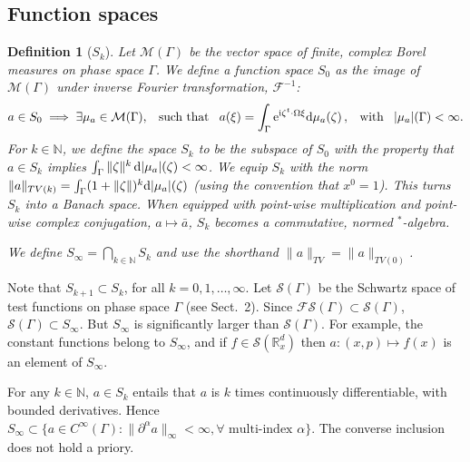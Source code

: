 \documentclass[12pt]{article}
\newcommand{\nn}{\mathbb{N}}
\newcommand{\rr}{\mathbb{R}}
\renewcommand{\d}{{\rm d}}
\newcommand{\e}{{\rm e}}
\renewcommand{\i}{{\rm i}}
\newtheorem{definition}[theorem]{Definition}
\begin{document}
\subsection{Function spaces}
\begin{definition}[$S_k$]
Let $\mathcal M(\Gamma)$ be the vector space of finite, complex Borel measures on phase space $\Gamma$. We define
a function space $S_0$ as the image of $\mathcal M(\Gamma)$ under inverse Fourier transformation, 
$\mathcal F^{-1}$:
\begin{equation}\label{Borel meas}
a\in S_0\implies \exists \mu_a\in \mathcal M(\Gamma), \,\ \mbox{ such that }\,\ a(\xi)=\int_\Gamma \e^{\i \zeta^{t}\cdot 
\Omega \xi}\d\mu_a(\zeta)\,,\,\ \mbox{ with }\,\ |\mu_a|(\Gamma)<\infty.
\end{equation}
For $k\in \nn$, we define the space $S_k$ to be the subspace of $S_0$ with the property that $a\in S_k$ implies 
$\int_\Gamma \|\zeta\|^k\, \d|\mu_a|(\zeta) <\infty$.
We equip $S_k$ with the norm $\|a\|_{TV(k)}=\int_\Gamma(1+\|\zeta\|)^k \d|\mu_a|(\zeta)$ (using the 
convention that $x^0=1$). This turns $S_k$ into a Banach space. When equipped with point-wise multiplication 
and point-wise complex conjugation, $a\mapsto\bar a$, $S_k$ becomes a commutative, normed $^{*}$-algebra.

We define $S_\infty=\bigcap_{k\in \nn} S_k$ and use the shorthand $\|a\|_{TV}=\|a\|_{TV(0)}$.
\end{definition}
Note that $S_{k+1}\subset S_k$, for all $k=0,1,\dotsc,\infty$. Let $\mathcal{S}(\Gamma)$ be the Schwartz space of 
test functions on phase space $\Gamma$ (see Sect.~2). Since $\mathcal F\mathcal S(\Gamma)\subset\mathcal S(\Gamma)$, 
$\mathcal S(\Gamma)\subset S_\infty$. But $S_\infty$ is significantly larger than $\mathcal S(\Gamma)$. 
For example, the constant functions belong to $S_\infty$, and if $f\in \mathcal S(\rr_x^d)$ then $a:(x,p)\mapsto f(x)$ 
is an element of $S_\infty$. 

For any $k\in \nn$, $a\in S_k$ entails that $a$ is $k$ times continuously differentiable, with bounded derivatives. Hence $S_\infty\subset \{a\in C^{\infty}(\Gamma) : \|\partial^\alpha a\|_\infty<\infty, \forall \mbox{ multi-index } \alpha\}$. The converse inclusion does not hold a priory.
\end{document}
